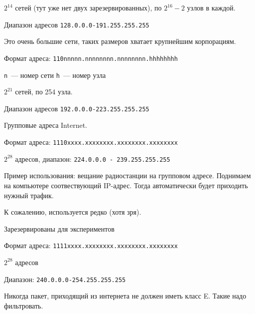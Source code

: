 $2^{14}$ сетей (тут уже нет двух зарезервированных), по $2^{16}-2$ узлов в каждой.

Диапазон адресов {\tt 128.0.0.0-191.255.255.255}

Это очень большие сети, таких размеров хватает крупнейшим корпорациям.


Формат адреса: {\tt 110nnnnn.nnnnnnnn.nnnnnnnn.hhhhhhhh}

{\tt n}~--- номер сети
{\tt h}~--- номер узла

$2^{21}$ сетей, по 254 узла.

Диапазон адресов {\tt 192.0.0.0-223.255.255.255}


Групповые адреса Internet.

Формат адреса: {\tt 1110xxxx.xxxxxxxx.xxxxxxxx.xxxxxxxx}

$2^{28}$ адресов, диапазон: {\tt 224.0.0.0 - 239.255.255.255}

Пример использования: вещание радиостанции на групповом адресе. Поднимаем на компьютере соотвествующий IP-адрес. Тогда автоматически будет приходить нужный трафик.

К сожалению, используется редко (хотя зря).


Зарезервированы для экспериментов

Формат адреса: {\tt 1111xxxx.xxxxxxxx.xxxxxxxx.xxxxxxxx}

$2^{28}$ адресов

Диапазон: {\tt 240.0.0.0-254.255.255.255}

Никогда пакет, приходящий из интернета не должен иметь класс E. Такие надо фильтровать.


